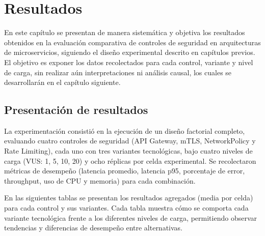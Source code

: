 
\chapter{Resultados}
\label{cap:resultados}

En este capítulo se presentan de manera sistemática y objetiva los resultados obtenidos en la evaluación comparativa de controles de seguridad en arquitecturas de microservicios, siguiendo el diseño experimental descrito en capítulos previos. El objetivo es exponer los datos recolectados para cada control, variante y nivel de carga, sin realizar aún interpretaciones ni análisis causal, los cuales se desarrollarán en el capítulo siguiente.

\section{Presentación de resultados}

La experimentación consistió en la ejecución de un diseño factorial completo, evaluando cuatro controles de seguridad (API Gateway, mTLS, NetworkPolicy y Rate Limiting), cada uno con tres variantes tecnológicas, bajo cuatro niveles de carga (VUS: 1, 5, 10, 20) y ocho réplicas por celda experimental. Se recolectaron métricas de desempeño (latencia promedio, latencia p95, porcentaje de error, throughput, uso de CPU y memoria) para cada combinación.

En las siguientes tablas se presentan los resultados agregados (media por celda) para cada control y sus variantes. Cada tabla muestra cómo se comporta cada variante tecnológica frente a los diferentes niveles de carga, permitiendo observar tendencias y diferencias de desempeño entre alternativas.

